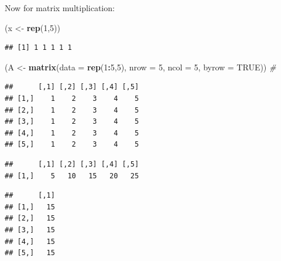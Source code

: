 \documentclass[]{book}
\newenvironment{Shaded}{\begin{snugshade}}{\end{snugshade}}
\newcommand{\KeywordTok}[1]{\textcolor[rgb]{0.13,0.29,0.53}{\textbf{#1}}}
\newcommand{\DataTypeTok}[1]{\textcolor[rgb]{0.13,0.29,0.53}{#1}}
\newcommand{\DecValTok}[1]{\textcolor[rgb]{0.00,0.00,0.81}{#1}}
\newcommand{\StringTok}[1]{\textcolor[rgb]{0.31,0.60,0.02}{#1}}
\newcommand{\CommentTok}[1]{\textcolor[rgb]{0.56,0.35,0.01}{\textit{#1}}}
\newcommand{\OtherTok}[1]{\textcolor[rgb]{0.56,0.35,0.01}{#1}}
\newcommand{\OperatorTok}[1]{\textcolor[rgb]{0.81,0.36,0.00}{\textbf{#1}}}
\newcommand{\NormalTok}[1]{#1}
\theoremstyle{definition}
\theoremstyle{definition}
\theoremstyle{definition}
\theoremstyle{remark}
\begin{document}
Now for matrix multiplication:

\begin{Shaded}
\begin{Highlighting}[]
\NormalTok{(x <-}\StringTok{ }\KeywordTok{rep}\NormalTok{(}\DecValTok{1}\NormalTok{,}\DecValTok{5}\NormalTok{))}
\end{Highlighting}
\end{Shaded}

\begin{verbatim}
## [1] 1 1 1 1 1
\end{verbatim}

\begin{Shaded}
\begin{Highlighting}[]
\NormalTok{(A <-}\StringTok{ }\KeywordTok{matrix}\NormalTok{(}\DataTypeTok{data =} \KeywordTok{rep}\NormalTok{(}\DecValTok{1}\OperatorTok{:}\DecValTok{5}\NormalTok{,}\DecValTok{5}\NormalTok{), }\DataTypeTok{nrow =} \DecValTok{5}\NormalTok{, }\DataTypeTok{ncol =} \DecValTok{5}\NormalTok{, }\DataTypeTok{byrow =} \OtherTok{TRUE}\NormalTok{)) }\CommentTok{# }
\end{Highlighting}
\end{Shaded}

\begin{verbatim}
##      [,1] [,2] [,3] [,4] [,5]
## [1,]    1    2    3    4    5
## [2,]    1    2    3    4    5
## [3,]    1    2    3    4    5
## [4,]    1    2    3    4    5
## [5,]    1    2    3    4    5
\end{verbatim}

\begin{Shaded}
\end{Shaded}

\begin{verbatim}
##      [,1] [,2] [,3] [,4] [,5]
## [1,]    5   10   15   20   25
\end{verbatim}

\begin{Shaded}
\end{Shaded}

\begin{verbatim}
##      [,1]
## [1,]   15
## [2,]   15
## [3,]   15
## [4,]   15
## [5,]   15
\end{verbatim}
\end{document}
